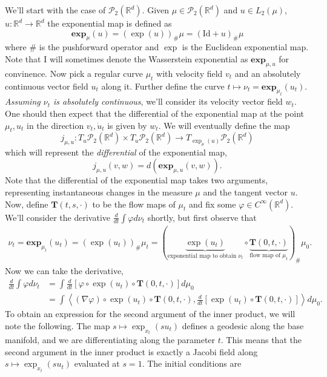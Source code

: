 \documentclass{article}
\begin{document}
We'll start with the case of $\mathcal{P}_2(\mathbb{R}^d)$. Given $\mu \in \mathcal{P}_2(\mathbb{R}^d)$ and $u \in L_2(\mu)$, $u:\mathbb{R}^d \rightarrow \mathbb{R}^d$ the exponential map is defined as 
\begin{equation}
    \mathbf{exp}_\mu(u) = (\exp(u))_\#\mu = (\text{Id} + u)_\#\mu
\end{equation}
where $\#$ is the pushforward operator and $\exp$ is the Euclidean exponential map. Note that I will sometimes denote the Wasserstein exponential as $\mathbf{exp}_{\mu, u}$ for convinence. Now pick a regular curve $\mu_t$ with velocity field $v_t$ and an absolutely continuous vector field $u_t$ along it. Further define the curve $t \mapsto \nu_t = \mathbf{exp}_{\mu_t}(u_t)$. \textit{Assuming $\nu_t$ is absolutely continuous}, we'll consider its velocity vector field $w_t$. One should then expect that the differential of the exponential map at the point $\mu_t, u_t$ in the direction $v_t, \dot{u}_t$ is given by $w_t$. We will eventually define the map 
\[j_{\mu, u}: T_u \mathcal{P}_2(\mathbb{R}^d) \times T_u \mathcal{P}_2(\mathbb{R}^d) \rightarrow T_{\exp_{\mu}(u)} \mathcal{P}_2(\mathbb{R}^d) \]
which will represent the \textit{differential} of the exponential map,
\begin{equation}
    j_{\mu, u}(v, w) = d(\mathbf{exp}_{\mu, u}(v, w)).
\end{equation}
Note that the differential of the exponential map takes two arguments, representing instantaneous changes in the measure $\mu$ and the tangent vector $u$. Now, define $\mathbf{T}(t, s, \cdot)$ to be the flow maps of $\mu_t$ and fix some $\varphi \in C^{\infty}(\mathbb{R}^d)$. We'll consider the derivative $\frac{d}{dt}\int\varphi d\nu_t$ shortly, but first observe that
\begin{align}
    \nu_t = \mathbf{exp}_{\mu_t}(u_t) = (\exp(u_t))_\#\mu_t = (\underbrace{\exp(u_t)}_{\text{exponential map to obtain $\nu_t$}} \circ \underbrace{\mathbf{T}(0,t, \cdot)}_{\text{flow map of $\mu_t$}})_\#\mu_0.
\end{align}
Now we can take the derivative,
\begin{align}
    \frac{d}{dt}\int\varphi d\nu_t &= \int \frac{d}{dt}\left[\varphi\circ\exp(u_t) \circ \mathbf{T}(0, t, \cdot)\right] d\mu_0 \\
    &= \int \left\langle (\nabla\varphi) \circ \exp(u_t) \circ \mathbf{T}(0, t, \cdot), \frac{d}{dt} [\exp(u_t) \circ \mathbf{T}(0, t, \cdot)] \right\rangle  d\mu_0.
\end{align} 
To obtain an expression for the second argument of the inner product, we will note the following. The map $s \mapsto \exp_{x_t}(su_t)$ defines a geodesic along the base manifold, and we are differentiating along the parameter $t$. This means that the second argument in the inner product is exactly a Jacobi field along $s \mapsto \exp_{x_t}(su_t)$ evaluated at $s = 1$. The initial conditions are 
\end{document}
